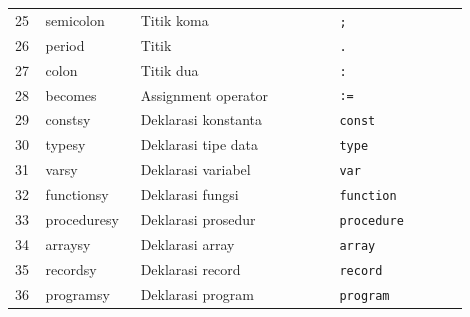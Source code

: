 \begin{center}
\begin{longtable}{p{0.06\linewidth} p{0.18\linewidth} p{0.40\linewidth} p{0.26\linewidth}}
        25 & semicolon   & Titik koma                                                                                                                  & \texttt{;}                     \\
        26 & period      & Titik                                                                                                                       & \texttt{.}                     \\
        27 & colon       & Titik dua                                                                                                                   & \texttt{:}                     \\
        28 & becomes     & Assignment operator                                                                                                         & \texttt{:=}                    \\
        29 & constsy     & Deklarasi konstanta                                                                                                         & \texttt{const}                 \\
        30 & typesy      & Deklarasi tipe data                                                                                                         & \texttt{type}                  \\
        31 & varsy       & Deklarasi variabel                                                                                                          & \texttt{var}                   \\
        32 & functionsy  & Deklarasi fungsi                                                                                                            & \texttt{function}              \\
        33 & proceduresy & Deklarasi prosedur                                                                                                          & \texttt{procedure}             \\
        34 & arraysy     & Deklarasi array                                                                                                             & \texttt{array}                 \\
        35 & recordsy    & Deklarasi record                                                                                                            & \texttt{record}                \\
        36 & programsy   & Deklarasi program                                                                                                           & \texttt{program}               \\

\end{longtable}
\end{center}
